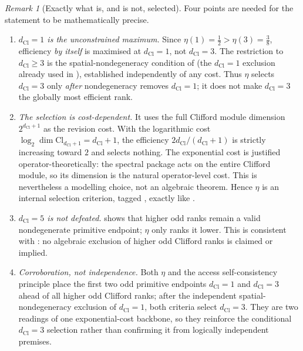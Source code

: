 \documentclass[11pt]{article}
\theoremstyle{definition}
\theoremstyle{remark}
\newtheorem{remark}[theorem]{Remark}
\newcommand{\Cl}{\mathrm{Cl}}
\newcommand{\dCl}{d_{\mathrm{Cl}}}
\begin{document}
\begin{remark}[Exactly what is, and is not, selected]
\label{rem:efficiency-honest}
Four points are needed for the statement to be mathematically precise.
\begin{enumerate}[label=\textup{(\alph*)},leftmargin=2.2em]
\item \emph{\(\dCl=1\) is the unconstrained maximum.}  Since \(\eta(1)=\tfrac12>
      \eta(3)=\tfrac38\), efficiency \emph{by itself} is maximised at \(\dCl=1\),
      not \(\dCl=3\).  The restriction to \(\dCl\ge3\) is the spatial-nondegeneracy
      condition of  (the \(\dCl=1\) exclusion
      already used in ), established
      independently of any cost.  Thus \(\eta\) selects \(\dCl=3\) only \emph{after}
      nondegeneracy removes \(\dCl=1\); it does not make \(\dCl=3\) the globally most
      efficient rank.
\item \emph{The selection is cost-dependent.}  It uses the full Clifford module
      dimension \(2^{\dCl+1}\) as the revision cost.  With the logarithmic cost
      \(\log_2\dim\Cl_{\dCl+1}=\dCl+1\), the efficiency \(2\dCl/(\dCl+1)\) is strictly
      increasing toward \(2\) and selects nothing.  The exponential cost is
      justified operator-theoretically: the spectral package acts on the entire
      Clifford module, so its dimension is the natural operator-level cost.  This
      is nevertheless a modelling choice, not an algebraic theorem.  Hence
      \(\eta\) is an internal selection criterion, tagged , exactly
      like .
\item \emph{\(\dCl=5\) is not defeated.}   shows that higher odd ranks remain a valid
      nondegenerate primitive endpoint; \(\eta\) only ranks it lower.  This is
      consistent with : no algebraic exclusion of
      higher odd Clifford ranks is claimed or implied.
\item \emph{Corroboration, not independence.}  Both \(\eta\) and the access
      self-consistency principle place the first two odd primitive endpoints
      \(\dCl=1\) and \(\dCl=3\) ahead of all higher odd Clifford ranks; after the independent
      spatial-nondegeneracy exclusion of \(\dCl=1\), both criteria select \(\dCl=3\).
      They are two readings of one exponential-cost backbone, so they reinforce
      the conditional \(\dCl=3\) selection rather than confirming it from logically
      independent premises.
\end{enumerate}
\end{remark}
\end{document}
